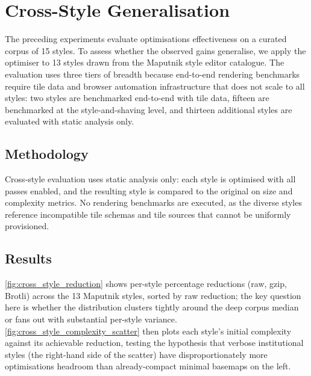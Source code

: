 \section{Cross-Style Generalisation}\label{sec_exp_cross_style}

The preceding experiments evaluate optimisations effectiveness on a curated corpus of 15 styles.
To assess whether the observed gains generalise, we apply the optimiser to 13 styles drawn from the Maputnik style editor catalogue.
The evaluation uses three tiers of breadth because end-to-end rendering benchmarks require tile data and browser automation infrastructure that does not scale to all styles: two styles are benchmarked end-to-end with tile data, fifteen are benchmarked at the style-and-shaving level, and thirteen additional styles are evaluated with static analysis only.

\subsection{Methodology}\label{sub_cross_methodology}

Cross-style evaluation uses static analysis only: each style is optimised with all passes enabled, and the resulting style is compared to the original on size and complexity metrics.
No rendering benchmarks are executed, as the diverse styles reference incompatible tile schemas and tile sources that cannot be uniformly provisioned.

\subsection{Results}\label{sub_cross_results}

\cref{fig:cross_style_reduction} shows per-style percentage reductions (raw, gzip, Brotli) across the 13 Maputnik styles, sorted by raw reduction; the key question here is whether the distribution clusters tightly around the deep corpus median or fans out with substantial per-style variance.
\cref{fig:cross_style_complexity_scatter} then plots each style's initial complexity against its achievable reduction, testing the hypothesis that verbose institutional styles (the right-hand side of the scatter) have disproportionately more optimisations headroom than already-compact minimal basemaps on the left.

